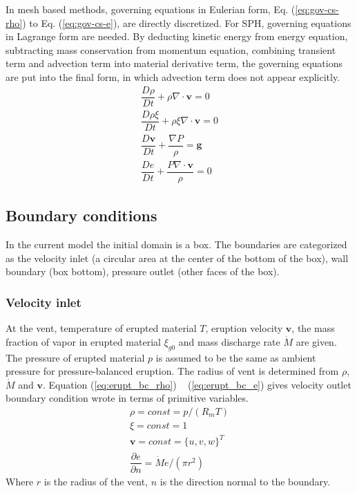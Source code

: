 \documentclass[journal abbreviation, manuscript]{copernicus}
\begin{document}
In mesh based methods, governing equations in Eulerian form, Eq. (\ref{eq:gov-cs-rho}) to Eq. (\ref{eq:gov-cs-e}), are directly discretized. For SPH, governing equations in Lagrange form are needed. By deducting kinetic energy from energy equation, subtracting mass conservation from momentum equation, combining transient term and advection term into material derivative term, the governing equations are put into the final form, in which advection term does not appear explicitly.
\begin{align}
\dfrac{D \rho}{D t} + \rho \nabla \cdot \textbf{v} = 0 \label{eq:gov-nc-rho}\\
\dfrac{D \rho \xi}{D t} + \rho \xi \nabla \cdot \textbf{v} = 0 \label{eq:gov-nc-ks}\\
\dfrac{D \textbf{v}}{D t} + \dfrac{\nabla P}{\rho} =\textbf{g} \label{eq:gov-nc-v}\\
\dfrac{D e}{D t} + \dfrac{P \nabla \cdot \textbf{v}}{\rho} = 0 \label{eq:gov-nc-e}
\end{align}

\subsection{Boundary conditions}
In the current model the initial domain is a box. The boundaries are categorized as the velocity inlet (a circular area at the center of the bottom of the box), wall boundary (box bottom), pressure outlet (other faces of the box).

\subsubsection{Velocity inlet}
At the vent, temperature of erupted material $T$, eruption velocity $\textbf{v}$, the mass fraction of vapor in erupted material $\xi_{g0}$ and mass discharge rate $\dot M$ are given. The pressure of erupted material $p$ is assumed to be the same as ambient pressure for pressure-balanced eruption. The radius of vent is determined from $\rho$, $\dot M$ and $\textbf{v}$. Equation (\ref{eq:erupt_bc_rho}) ~ (\ref{eq:erupt_bc_e}) gives velocity outlet boundary condition wrote in terms of primitive variables.
\begin{align}
\rho =const = p/\left(R_m T\right) \label{eq:erupt_bc_rho} \\
\xi=const=1 \label{eq:erupt_bc_xi}\\
\textbf{v} = const =\{u,v,w\}^T \label{eq:erupt_bc_v}\\
\dfrac{\partial e}{\partial n}=\dot M e /\left(\pi r^2\right) \label{eq:erupt_bc_e}
\end{align} 
Where $r$ is the radius of the vent, $n$ is the direction normal to the boundary.
\end{document}
